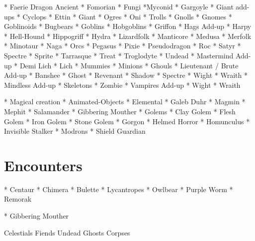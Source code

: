 \documentclass[letterpaper,10pt,twoside,twocolumn,openany]{book}
\begin{document}
* Faerie Dragon Ancient %
* Fomorian %
* Fungi%
	*Myconid 
* Gargoyle %
* Giant add-ups 
	* Cyclops 
	* Ettin 
	* Giant
	* Ogres
	* Oni %
	* Trolls
* Gnolls %
* Gnomes %
* Goblinoids
	* Bugbears 
	* Goblins %
	* Hobgoblins %
* Griffon %
* Hags Add-up
* Harpy %
* Hell-Hound %
* Hippogriff %
* Hydra %
* Lizardfolk %
* Manticore %
* Medusa %
* Merfolk %
* Minotaur %
* Naga %
* Orcs %
* Pegasus %
* Pixie %
* Pseudodragon %
* Roc %
* Satyr %
* Spectre %
* Sprite %
* Tarrasque %
* Treat %
* Troglodyte %
* Undead
	* Mastermind Add-up
		* Demi Lich
		* Lich
		* Mummies %
	* Minions
		* Ghouls %
	* Lieutenant / Brute Add-up %
		* Banshee
		* Ghost
		* Revenant
		* Shadow
		* Spectre
		* Wight
		* Wraith
	* Mindless Add-up
		* Skeletons
		* Zombie
* Vampires Add-up
* Wight %
* Wraith %




* Magical creation
	* Animated-Objects
	* Elemental
		* Galeb Duhr
		* Magmin
		* Mephit
		* Salamander
	* Gibbering Mouther
	* Golems
		* Clay Golem
		* Flesh Golem
		* Iron Golem
		* Stone Golem
	* Gorgon
	* Helmed Horror
	* Homunculus %
	* Invisible Stalker
	* Modrons
	* Shield Guardian

	
	
\part{Encounters}

* Centaur %
* Chimera %
* Bulette %
* Lycantropes %
* Owlbear %
* Purple Worm %
* Remorak %
	

* Gibbering Mouther 


Celestials
Fiends
Undead
	Ghosts
	Corpses
\end{document}
